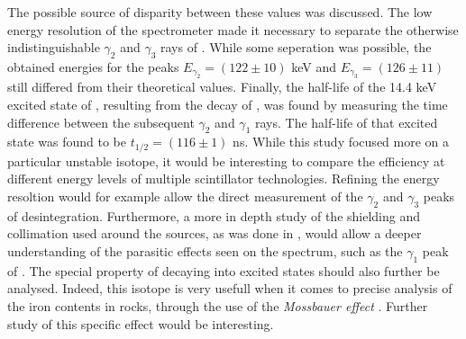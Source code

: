 The possible source of disparity between these values was discussed.
The low energy resolution of the spectrometer made it necessary to separate the otherwise indistinguishable $\gamma_2$ and $\gamma_3$ rays of \cobalt.
While some seperation was possible, the obtained energies for the peaks \(E_{\gamma_2} = (122 \pm 10)\) keV and \(E_{\gamma_3} = (126 \pm 11)\) still differed from their theoretical values.
Finally, the half-life of the 14.4 keV excited state of \iron, resulting from the decay of \cobalt, was found by measuring the time difference between the subsequent \(\gamma_2\) and \(\gamma_1\) rays.
The half-life of that excited state was found to be \(t_{1/2} = (116 \pm 1)\) ns.
While this study focused more on a particular unstable isotope, it would be interesting to compare the efficiency at different energy levels of multiple scintillator technologies.
Refining the energy resoltion would for example allow the direct measurement of the \(\gamma_2\) and \(\gamma_3\) peaks of \cobalt desintegration.
Furthermore, a more in depth study of the shielding and collimation used around the sources, as was done in \cite{smith_evaluation_2008}, would allow a deeper understanding of the parasitic effects seen on the spectrum, such as the \(\gamma_1\) peak of \lead.
The special property of \cobalt decaying into excited \iron states should also further be analysed.
Indeed, this isotope is very usefull when it comes to precise analysis of the iron contents in rocks, through the use of the \emph{Mossbauer effect} \cite{klingelhofer_mossbauer_2004}.
Further study of this specific effect would be interesting.